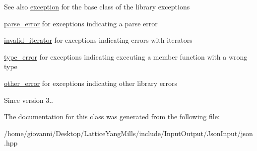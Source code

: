 \begin{DoxySeeAlso}{See also}
\hyperlink{classnlohmann_1_1detail_1_1exception}{exception} for the base class of the library exceptions 

\hyperlink{classnlohmann_1_1detail_1_1parse__error}{parse\+\_\+error} for exceptions indicating a parse error 

\hyperlink{classnlohmann_1_1detail_1_1invalid__iterator}{invalid\+\_\+iterator} for exceptions indicating errors with iterators 

\hyperlink{classnlohmann_1_1detail_1_1type__error}{type\+\_\+error} for exceptions indicating executing a member function with a wrong type 

\hyperlink{classnlohmann_1_1detail_1_1other__error}{other\+\_\+error} for exceptions indicating other library errors
\end{DoxySeeAlso}
\begin{DoxySince}{Since}
version 3.. 
\end{DoxySince}


The documentation for this class was generated from the following file\+:\begin{DoxyCompactItemize}
\item 
/home/giovanni/\+Desktop/\+Lattice\+Yang\+Mills/include/\+Input\+Output/\+Json\+Input/json.\+hpp\end{DoxyCompactItemize}
